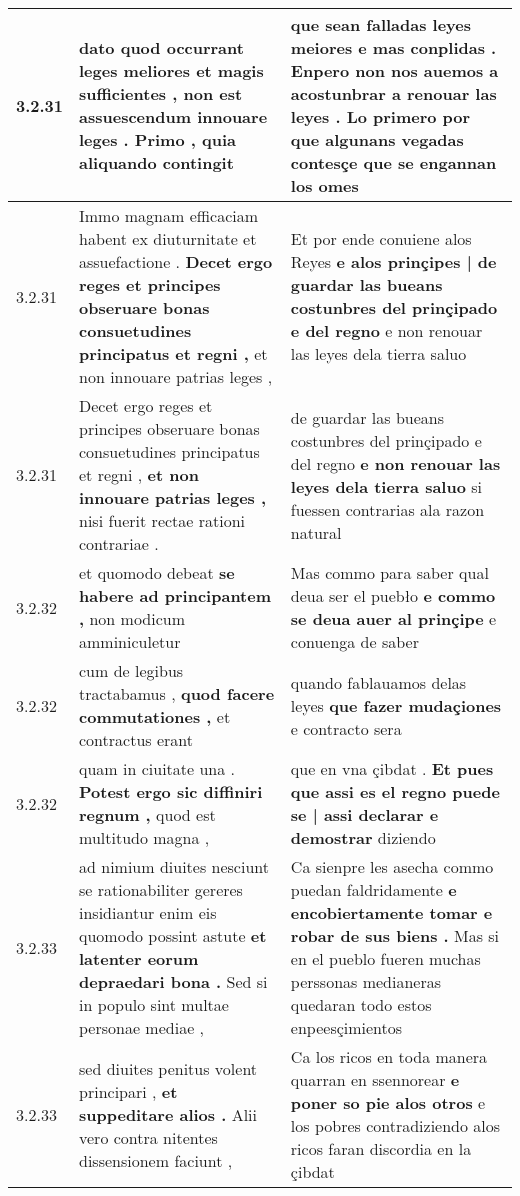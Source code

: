 \begin{tabular}{|p{1cm}|p{6.5cm}|p{6.5cm}|}
3.2.31 & dato quod occurrant leges meliores et magis sufficientes , \textbf{ non est assuescendum innouare leges . } Primo , quia aliquando contingit & que sean falladas leyes meiores e mas conplidas . \textbf{ Enpero non nos auemos a acostunbrar a renouar las leyes . } Lo primero por que algunans vegadas contesçe que se engannan los omes \\\hline
3.2.31 & Immo magnam efficaciam habent ex diuturnitate et assuefactione . \textbf{ Decet ergo reges et principes obseruare bonas consuetudines principatus et regni , } et non innouare patrias leges , & Et por ende conuiene alos Reyes \textbf{ e alos prinçipes | de guardar las bueans costunbres del prinçipado e del regno } e non renouar las leyes dela tierra saluo \\\hline
3.2.31 & Decet ergo reges et principes obseruare bonas consuetudines principatus et regni , \textbf{ et non innouare patrias leges , } nisi fuerit rectae rationi contrariae . & de guardar las bueans costunbres del prinçipado e del regno \textbf{ e non renouar las leyes dela tierra saluo } si fuessen contrarias ala razon natural \\\hline
3.2.32 & et quomodo debeat \textbf{ se habere ad principantem , } non modicum amminiculetur & Mas commo para saber qual deua ser el puebło \textbf{ e commo se deua auer al prinçipe } e conuenga de saber \\\hline
3.2.32 & cum de legibus tractabamus , \textbf{ quod facere commutationes , } et contractus erant & quando fablauamos delas leyes \textbf{ que fazer mudaçiones } e contracto sera \\\hline
3.2.32 & quam in ciuitate una . \textbf{ Potest ergo sic diffiniri regnum , } quod est multitudo magna , & que en vna çibdat . \textbf{ Et pues que assi es el regno puede se | assi declarar e demostrar } diziendo \\\hline
3.2.33 & ad nimium diuites nesciunt se rationabiliter gereres insidiantur enim eis quomodo possint astute \textbf{ et latenter eorum depraedari bona . } Sed si in populo sint multae personae mediae , & Ca sienpre les asecha commo puedan faldridamente \textbf{ e encobiertamente tomar e robar de sus biens . } Mas si en el pueblo fueren muchas perssonas medianeras quedaran todo estos enpeesçimientos \\\hline
3.2.33 & sed diuites penitus volent principari , \textbf{ et suppeditare alios . } Alii vero contra nitentes dissensionem faciunt , & Ca los ricos en toda manera quarran en ssennorear \textbf{ e poner so pie alos otros } e los pobres contradiziendo alos ricos faran discordia en la çibdat \\\hline

\end{tabular}

